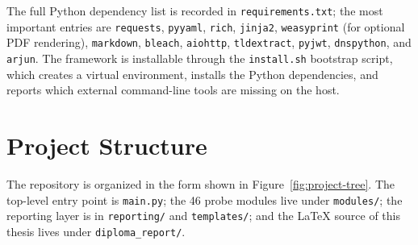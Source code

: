 The full Python dependency list is recorded in \texttt{requirements.txt}; the most important entries are \texttt{requests}, \texttt{pyyaml}, \texttt{rich}, \texttt{jinja2}, \texttt{weasyprint} (for optional PDF rendering), \texttt{markdown}, \texttt{bleach}, \texttt{aiohttp}, \texttt{tldextract}, \texttt{pyjwt}, \texttt{dnspython}, and \texttt{arjun}. The framework is installable through the \texttt{install.sh} bootstrap script, which creates a virtual environment, installs the Python dependencies, and reports which external command-line tools are missing on the host.

\section{Project Structure}

The repository is organized in the form shown in Figure~\ref{fig:project-tree}. The top-level entry point is \texttt{main.py}; the 46 probe modules live under \texttt{modules/}; the reporting layer is in \texttt{reporting/} and \texttt{templates/}; and the LaTeX source of this thesis lives under \texttt{diploma\_report/}.

